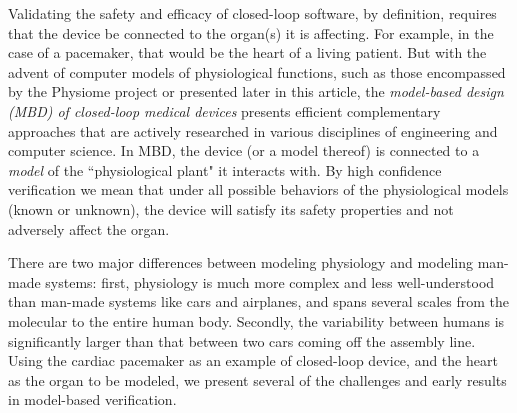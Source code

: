 Validating the safety and efficacy of closed-loop software, by definition, requires that the device be connected to the organ(s) it is affecting. 
For example, in the case of a pacemaker, that would be the heart of a living patient.
But with the advent of computer models of physiological functions, such as those encompassed by the Physiome project or presented later in this article, the \emph{model-based design (MBD) of closed-loop medical devices} presents efficient complementary approaches that are actively researched in various disciplines of engineering and computer science.
In MBD, the device (or a model thereof) is connected to a \emph{model} of the ``physiological plant" it interacts with.
By high confidence verification we mean that under all possible behaviors of the physiological models (known or unknown), the device will satisfy its safety properties and not adversely affect the organ.

There are two major differences between modeling physiology and modeling man-made systems:
first, physiology is much more complex and less well-understood than man-made systems like cars and airplanes, and spans several scales from the molecular to the entire human body.
Secondly, the variability between humans is significantly larger than that between two cars coming off the assembly line.
Using the cardiac pacemaker as an example of closed-loop device, and the heart as the organ to be modeled, we present several of the challenges and early results in model-based verification.

